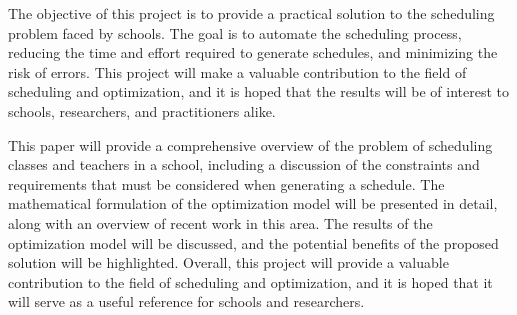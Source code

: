 \documentclass{article}
\begin{document}
The objective of this project is to provide a practical solution to the scheduling problem faced by schools. The goal is to automate the scheduling process, reducing the time and effort required to generate schedules, and minimizing the risk of errors. This project will make a valuable contribution to the field of scheduling and optimization, and it is hoped that the results will be of interest to schools, researchers, and practitioners alike.

This paper will provide a comprehensive overview of the problem of scheduling classes and teachers in a school, including a discussion of the constraints and requirements that must be considered when generating a schedule. The mathematical formulation of the optimization model will be presented in detail, along with an overview of recent work in this area. The results of the optimization model will be discussed, and the potential benefits of the proposed solution will be highlighted. Overall, this project will provide a valuable contribution to the field of scheduling and optimization, and it is hoped that it will serve as a useful reference for schools and researchers.





\end{document}
